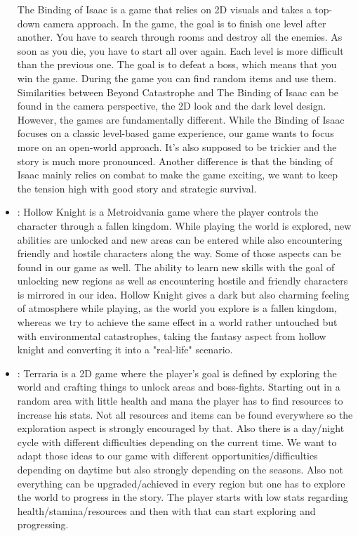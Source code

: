 \documentclass[a4paper]{scrreprt}
\begin{document}
\begin{itemize}
    The Binding of Isaac is a game that relies on 2D visuals and takes a top-down camera approach. In the game, the goal is to finish one level after another. You have to search through rooms and destroy all the enemies. As soon as you die, you have to start all over again. Each level is more difficult than the previous one. The goal is to defeat a boss, which means that you win the game. During the game you can find random items and use them. Similarities between Beyond Catastrophe and The Binding of Isaac can be found in the camera perspective, the 2D look and the dark level design. However, the games are fundamentally different. While the Binding of Isaac focuses on a classic level-based game experience, our game wants to focus more on an open-world approach. It's also supposed to be trickier and the story is much more pronounced. Another difference is that the binding of Isaac mainly relies on combat to make the game exciting, we want to keep the tension high with good story and strategic survival.
    \item \cite{hollowknight}:\newline 
    Hollow Knight is a Metroidvania game where the player controls the character through a fallen kingdom. While playing the world is explored, new abilities are unlocked and new areas can be entered while also encountering friendly and hostile characters along the way. Some of those aspects can be found in our game as well. The ability to learn new skills with the goal of unlocking new regions as well as encountering hostile and friendly characters is mirrored in our idea. Hollow Knight gives a dark but also charming feeling of atmosphere while playing, as the world you explore is a fallen kingdom, whereas we try to achieve the same effect in a world rather untouched but with environmental catastrophes, taking the fantasy aspect from hollow knight and converting it into a "real-life" scenario.
    \item \cite{terraria}:\newline
    Terraria is a 2D game where the player's goal is defined by exploring the world and crafting things to unlock areas and boss-fights. Starting out in a random area with little health and mana the player has to find resources to increase his stats. Not all resources and items can be found everywhere so the exploration aspect is strongly encouraged by that. Also there is a day/night cycle with different difficulties depending on the current time. We want to adapt those ideas to our game with different opportunities/difficulties depending on daytime but also strongly depending on the seasons. Also not everything can be upgraded/achieved in every region but one has to explore the world to progress in the story. The player starts with low stats regarding health/stamina/resources and then with that can start exploring and progressing.

\end{itemize}
\end{document}
